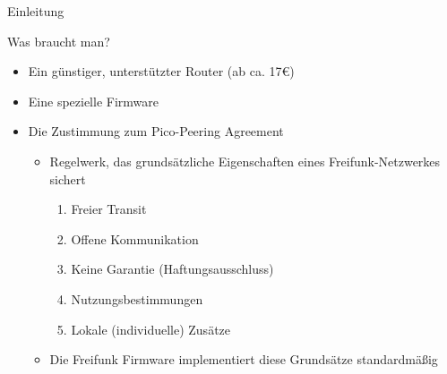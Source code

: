 \begin{frame}{Einleitung}
    \begin{block}{Was braucht man?}
        \begin{itemize}
            \item Ein günstiger, unterstützter Router (ab ca. 17€)
            \item Eine spezielle Firmware
            \item Die Zustimmung zum \glqq{}Pico-Peering Agreement\grqq
            \begin{itemize}
                \item Regelwerk, das grundsätzliche Eigenschaften eines Freifunk-Netzwerkes sichert
                \begin{enumerate}
                    \item Freier Transit
                    \item Offene Kommunikation
                    \item Keine Garantie (Haftungsausschluss)
                    \item Nutzungsbestimmungen
                    \item Lokale (individuelle) Zusätze
                \end{enumerate}
                \item Die Freifunk Firmware implementiert diese Grundsätze standardmäßig
            \end{itemize}
        \end{itemize}
    \end{block}
\end{frame}
